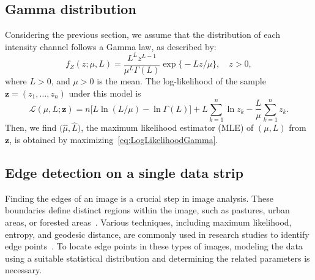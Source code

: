 \documentclass{article}
\DeclareMathOperator{\Tr}{Tr}
\begin{document}
\subsection{Gamma distribution}

Considering the previous section, we assume that the distribution of each intensity channel  follows a Gamma law, as described by: 
\begin{equation}
f_Z(z;\mu,L)=\frac{L^{L}z^{L-1}}{\mu^{L}\Gamma(L)} \exp\big\{-Lz/\mu\big\},\quad z>0,
\label{func_dens_uni_gamma}
\end{equation}
where $L>0$, and
$\mu>0$ is the mean.
The log-likelihood of the sample $\bm{z} = (z_1,\dots,z_n)$ under this model is
\begin{equation}
\mathcal{L}(\mu, L; \mathbf{z}) = 
n \big[L\ln (L / \mu) - \ln \Gamma(L)\big]
+L \sum_{k=1}^{n}\ln z_k -\frac{L}{\mu}\sum_{k=1}^{n} z_k.
\label{eq:LogLikelihoodGamma}
\end{equation}
Then, we find $\big(\widehat \mu, \widehat L\big)$, the maximum likelihood estimator (MLE) of $(\mu, L)$ from $\bm{z}$, is obtained by maximizing~\eqref{eq:LogLikelihoodGamma}.

\subsection{Edge detection on a single data strip}
Finding the edges of an image is a crucial step in image analysis. These boundaries define distinct regions within the image, such as pastures, urban areas, or forested areas~\cite{monferran2020modelo}. Various techniques, including maximum likelihood, entropy, and geodesic distance, are commonly used in research studies to identify edge points~\cite{NaranjoTorres2017,Nascimento2019}. To locate edge points in these types of images, modeling the data using a suitable statistical distribution and determining the related parameters is necessary.
\end{document}
